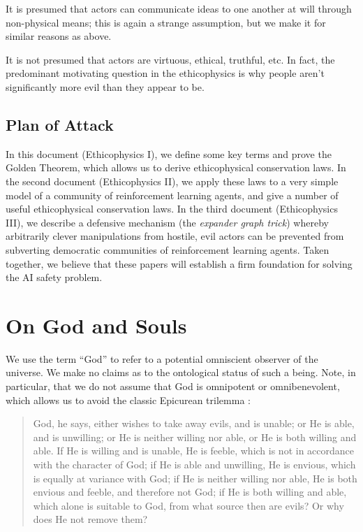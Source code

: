 \documentclass{article}
\begin{document}
It is presumed that actors can communicate ideas to one another at
will through non-physical means; this is again a strange assumption,
but we make it for similar reasons as above.

It is not presumed that actors are virtuous, ethical, truthful,
etc. In fact, the predominant motivating question in the ethicophysics
is why people aren't significantly more evil than they appear to be.

\subsection{Plan of Attack}

In this document (Ethicophysics I), we define some key terms and prove
the Golden Theorem, which allows us to derive ethicophysical
conservation laws. In the second document (Ethicophysics II), we apply
these laws to a very simple model of a community of reinforcement
learning agents, and give a number of useful ethicophysical
conservation laws. In the third document (Ethicophysics III), we
describe a defensive mechanism (the {\em expander graph trick})
whereby arbitrarily clever manipulations from hostile, evil actors can
be prevented from subverting democratic communities of reinforcement
learning agents. Taken together, we believe that these papers will
establish a firm foundation for solving the AI safety problem.

\section{On God and Souls}

We use the term ``God'' to refer to a potential omniscient observer of
the universe. We make no claims as to the ontological status of such a
being. Note, in particular, that we do not assume that God is
omnipotent or omnibenevolent, which allows us to avoid the classic
Epicurean trilemma \cite{trilemma}:

\begin{quote}
  God, he says, either wishes to take away evils, and is unable; or He
  is able, and is unwilling; or He is neither willing nor able, or He
  is both willing and able. If He is willing and is unable, He is
  feeble, which is not in accordance with the character of God; if He
  is able and unwilling, He is envious, which is equally at variance
  with God; if He is neither willing nor able, He is both envious and
  feeble, and therefore not God; if He is both willing and able, which
  alone is suitable to God, from what source then are evils? Or why
  does He not remove them?
\end{quote}
\end{document}
